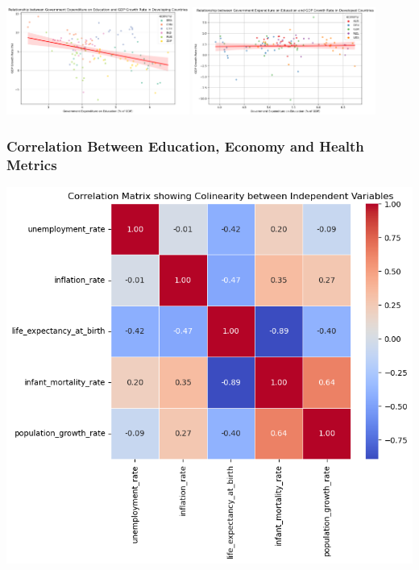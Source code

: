 \documentclass[
  letterpaper,
  DIV=11,
  numbers=noendperiod]{scrartcl}
\begin{document}
\includegraphics[width=0.45\textwidth,height=\textheight]{figures/GovernmentEducationExpenditures_GDPGrowthRate_Developing.png}
\includegraphics[width=0.45\textwidth,height=\textheight]{figures/GovernmentEducationExpenditures_GDPGrowthRate_Developed.png}

\subsubsection{Correlation Between Education, Economy and Health
Metrics}\label{correlation-between-education-economy-and-health-metrics}

\includegraphics[width=1\textwidth,height=\textheight]{figures/CorrelationMatrix_Independent_Variables.png}
\end{document}
